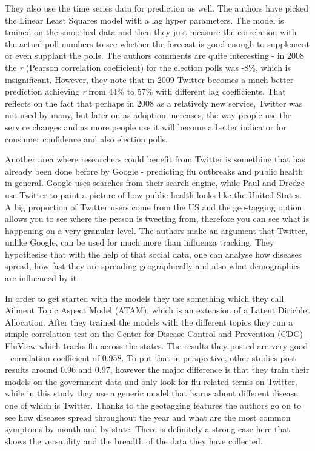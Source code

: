 \documentclass[minf,twoside,singlespacing,parskip,notimes,deptreport]{infthesis} %
\begin{document}
They also use the time series data for prediction as well. 
The authors have picked the Linear Least Squares model with a lag hyper parameters. 
The model is trained on the smoothed data and then they just measure the correlation with the actual poll numbers to see whether the forecast is good enough to supplement or even supplant the polls. 
The authors comments are quite interesting - in 2008 the \textit{r} (Pearson correlation coefficient) for the election polls was -8\%, which is insignificant. 
However, they note that in 2009 Twitter becomes a much better prediction achieving \textit{r} from 44\% to 57\% with different lag coefficients. 
That reflects on the fact that perhaps in 2008 as a relatively new service, Twitter was not used by many, but later on as adoption increases, the way people use the service changes and as more people use it will become a better indicator for consumer confidence and also election polls. 

Another area where researchers could benefit from Twitter is something that has already been done before by Google - predicting flu outbreaks and public health in general. 
Google uses searches from their search engine, while Paul and Dredze\cite{twitflu} use Twitter to paint a picture of how public health looks like the United States. 
A big proportion of Twitter users come from the US and the geo-tagging option allows you to see where the person is tweeting from, therefore you can see what is happening on a very granular level. 
The authors make an argument that Twitter, unlike Google, can be used for much more than influenza tracking. 
They hypothesise that with the help of that social data, one can analyse how diseases spread, how fast they are spreading geographically and also what demographics are influenced by it.


In order to get started with the models they use something which they call Ailment Topic Aspect Model (ATAM), which is an extension of a Latent Dirichlet Allocation\cite{lda}. 
After they trained the models with the different topics they run a simple correlation test on the Center for Disease Control and Prevention (CDC) FluView which tracks flu across the states. 
The results they posted are very good - correlation coefficient of 0.958. 
To put that in perspective, other studies post results around 0.96 and 0.97, however the major difference is that they train their models on the government data and only look for flu-related terms on Twitter, while in this study they use a generic model that learns about different disease one of which is Twitter. 
Thanks to the geotagging features the authors go on to see how diseases spread throughout the year and what are the most common symptoms by month and by state. 
There is definitely a strong case here that shows the versatility and the breadth of the data they have collected. 
\end{document}
